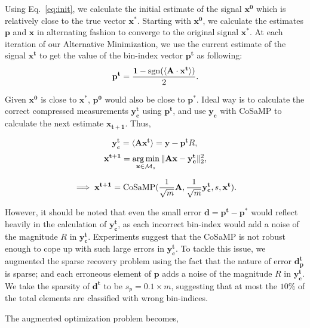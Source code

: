 Using Eq.~\ref{eq:init}, we calculate the initial estimate of the signal $\mathbf{{x}^0}$ which is relatively close to the true vector $\mathbf{x^*}$. Starting with $\mathbf{{x}^0}$, we  calculate the estimates $\mathbf{p}$ and $\mathbf{x}$ in alternating fashion to converge to the original signal $\mathbf{x^*}$. At each iteration of our Alternative Minimization, we use the current estimate of the signal ${\mathbf{x^t}}$ to get the value of the bin-index vector $\mathbf{{p}^t}$ as following:
\begin{equation}
\mathbf{{p}^{t}} = \frac{\mathbf{1}-\sgn(\langle \mathbf{A} \cdot \mathbf{x^t} \rangle)}{2}.
\label{step1}
\end{equation}

 
 Given $\mathbf{x^0}$ is close to $\mathbf{x^*}$, $\mathbf{p^0}$ would also be close to $\mathbf{p^*}$. Ideal way is to calculate the correct compressed measurements $\mathbf{y^t_c}$ using $\mathbf{p^t}$, and use $\mathbf{y_c}$ with CoSaMP to calculate the next estimate $\mathbf{{x}_{t+1}}$. Thus,


$$
\mathbf{y^t_c} = \langle \mathbf{A}\mathbf{x^{t}} \rangle = \mathbf{y} - \mathbf{p^t}R,
$$
$$
\mathbf{{x}^{t+1}} = \argmin_{\mathbf{x} \in \mathcal{M}_s}\norm{\mathbf{Ax} - \mathbf{y^t_c}}_2^2, %
$$

\begin{equation}
\implies \mathbf{{x}^{t+1}} = \cosamp(\frac{1}{\sqrt{m}}\mathbf{A},\frac{1}{\sqrt{m}}\mathbf{y^t_c},s,\mathbf{x^t}).
\label{eq:cosamp}
\end{equation}


 However, it should be noted that even the small error $\mathbf{d} = \mathbf{p^t - p^*}$ would reflect heavily in the calculation of $\mathbf{y^t_c}$, as each incorrect bin-index would add a noise of the magnitude $R$ in $\mathbf{y^t_c}$. Experiments suggest that the CoSaMP is not robust enough to cope up with such large errors in $\mathbf{y^t_c}$. To tackle this issue, we augmented the sparse recovery problem using the fact that the nature of error $\mathbf{d^t_p}$ is sparse; and each erroneous element of $\mathbf{p}$ adds a noise of the magnitude $R$ in $\mathbf{y^t_c}$. We take the sparsity of $\mathbf{d^t}$ to be $s_p = 0.1\times m$, suggesting that at most the $10\%$ of the total elements are classified with wrong bin-indices.
 
 The augmented optimization problem becomes,
  
